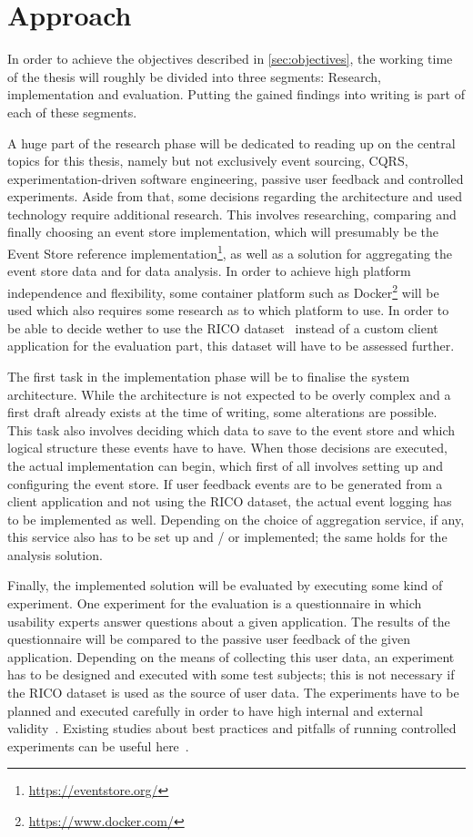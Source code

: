 %
\chapter{Approach}
\label{sec:approach}

In order to achieve the objectives described in \cref{sec:objectives}, the working time of the thesis will roughly be divided into three segments: Research, implementation and evaluation.
Putting the gained findings into writing is part of each of these segments.

A huge part of the research phase will be dedicated to reading up on the central topics for this thesis, namely but not exclusively event sourcing, \ac{CQRS}, experimentation-driven software engineering, passive user feedback and controlled experiments.
Aside from that, some decisions regarding the architecture and used technology require additional research.
This involves researching, comparing and finally choosing an event store implementation, which will presumably be the Event Store reference implementation\footnote{\url{https://eventstore.org/}}, as well as a solution for aggregating the event store data and for data analysis.
In order to achieve high platform independence and flexibility, some container platform such as Docker\footnote{\url{https://www.docker.com/}} will be used which also requires some research as to which platform to use.
In order to be able to decide wether to use the RICO dataset~\cite{Deka:2017:Rico} instead of a custom client application for the evaluation part, this dataset will have to be assessed further.

The first task in the implementation phase will be to finalise the system architecture.
While the architecture is not expected to be overly complex and a first draft already exists at the time of writing, some alterations are possible.
This task also involves deciding which data to save to the event store and which logical structure these events have to have.
When those decisions are executed, the actual implementation can begin, which first of all involves setting up and configuring the event store.
If user feedback events are to be generated from a client application and not using the RICO dataset, the actual event logging has to be implemented as well.
Depending on the choice of aggregation service, if any, this service also has to be set up and / or implemented; the same holds for the analysis solution.

Finally, the implemented solution will be evaluated by executing some kind of experiment.
One experiment for the evaluation is a questionnaire in which usability experts answer questions about a given application.
The results of the questionnaire will be compared to the passive user feedback of the given application.
Depending on the means of collecting this user data, an experiment has to be designed and executed with some test subjects; this is not necessary if the RICO dataset is used as the source of user data.
The experiments have to be planned and executed carefully in order to have high internal and external validity~\cite{Huitt2010}.
Existing studies about best practices and pitfalls of running controlled experiments can be useful here~\cite{Kohavi2009}.

